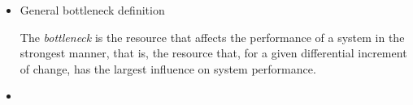 \begin{itemize}
    \item General bottleneck definition
        \begin{defn}\label{def:bottleneck}
            The \emph{bottleneck} is the resource that affects the performance of a system in the strongest
            manner, that is, the resource that, for a given differential increment of change, has
            the largest influence on system performance.
        \end{defn}

    \item {}
\end{itemize}
